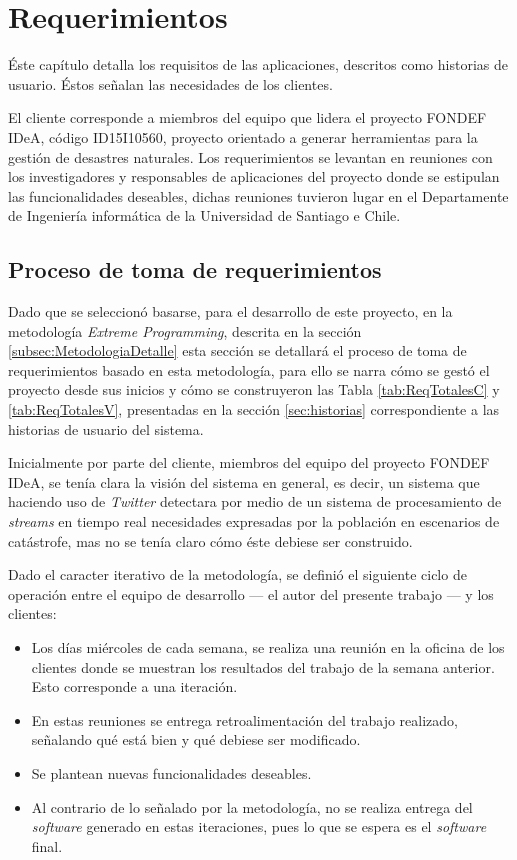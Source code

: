 \chapter{Requerimientos}
\label{cap:Requerimientos}

Éste capítulo detalla los requisitos de las aplicaciones, descritos como historias de usuario. Éstos señalan las necesidades de los clientes.

El cliente corresponde a miembros del equipo que lidera el proyecto FONDEF IDeA, código ID15I10560, proyecto orientado a generar herramientas para la gestión de desastres naturales. Los requerimientos se levantan en reuniones con los investigadores y responsables de aplicaciones del proyecto donde se estipulan las funcionalidades deseables, dichas reuniones tuvieron lugar en el Departamente de Ingeniería informática de la Universidad de Santiago e Chile.

\section{Proceso de toma de requerimientos}
\label{sec:tomaDeRequerimientos}

Dado que se seleccionó basarse, para el desarrollo de este proyecto, en la metodología \textit{Extreme Programming}, descrita en la sección \ref{subsec:MetodologiaDetalle} esta sección se detallará el proceso de toma de requerimientos basado en esta metodología, para ello se narra cómo se gestó el proyecto desde sus inicios y cómo se construyeron las Tabla \ref{tab:ReqTotalesC} y \ref{tab:ReqTotalesV}, presentadas en la sección \ref{sec:historias} correspondiente a las historias de usuario del sistema.

Inicialmente por parte del cliente, miembros del equipo del proyecto FONDEF IDeA, se tenía clara la visión del sistema en general, es decir, un sistema que haciendo uso de \textit{Twitter} detectara por medio de un sistema de procesamiento de \textit{streams} en tiempo real necesidades expresadas por la población en escenarios de catástrofe, mas no se tenía claro cómo éste debiese ser construido. 

Dado el caracter iterativo de la metodología, se definió el siguiente ciclo de operación entre el equipo de desarrollo — el autor del presente trabajo — y los clientes:

\begin{itemize}
\item Los días miércoles de cada semana, se realiza una reunión en la oficina de los clientes donde se muestran los resultados del trabajo de la semana anterior. Esto corresponde a una iteración.
\item En estas reuniones se entrega retroalimentación del trabajo realizado, señalando qué está bien y qué debiese ser modificado.
\item Se plantean nuevas funcionalidades deseables.
\item Al contrario de lo señalado por la metodología, no se realiza entrega del \textit{software} generado en estas iteraciones, pues lo que se espera es el \textit{software} final.
\end{itemize}

